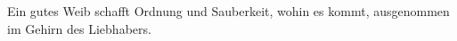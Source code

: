 Ein gutes Weib schafft Ordnung und Sauberkeit, wohin es kommt, ausgenommen im Gehirn des Liebhabers.
\par

